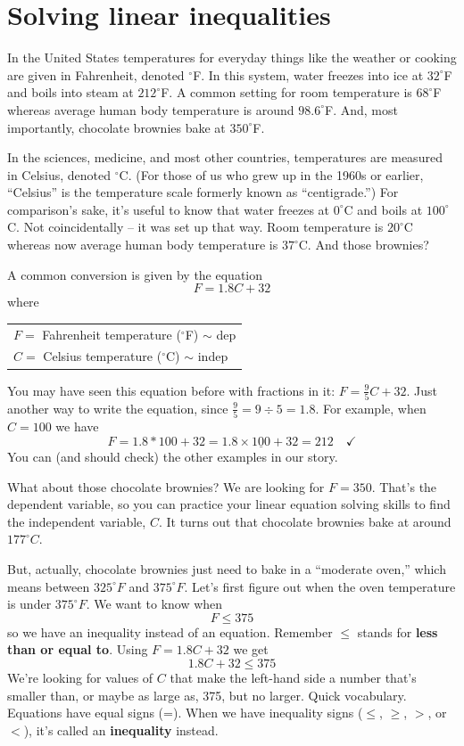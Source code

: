 

\section{Solving linear inequalities }

In the United States temperatures for everyday things like the weather or cooking are given in Fahrenheit, denoted $^\circ$F.  In this system, water freezes into ice at $32^\circ$F and boils into steam at $212^\circ$F.  A common setting for room temperature is $68^\circ$F whereas average human body temperature is around $98.6^\circ$F.  And, most importantly, chocolate brownies bake at $350^\circ$F.

In the sciences, medicine, and most other countries, temperatures are measured in Celsius, denoted $^\circ$C.  (For those of us who grew up in the 1960s or earlier, ``Celsius'' is the temperature scale formerly known as ``centigrade.'') 
For comparison's sake, it's useful to know that water freezes at $0^\circ$C and boils at $100^\circ$C.  Not coincidentally -- it was set up that way.  Room temperature is $20^\circ$C whereas now average human body temperature is $37^\circ$C.  And those brownies? 
 
A common conversion is given by the equation $$F = 1.8C+32$$ 
where 
\begin{center}
\begin{tabular} {l} 
$F=$ Fahrenheit temperature ($^\circ$F) $\sim$ dep \\
$C=$ Celsius temperature ($^\circ$C) $\sim$ indep \\ 
\end{tabular}
\end{center}
You may have seen this equation before with fractions in it:  $F = \frac{9}{5}C + 32$.  Just another way to write the equation, since $\frac{9}{5} = 9 \div 5 = 1.8$.  
For example, when $C=100$ we have $$F= 1.8 \ast 100 + 32 =1.8 \times \underline{100}+32= 212 \quad \checkmark$$   You can (and should check) the other examples in our story.
 
 What about those chocolate brownies?  
We are looking for $F=350$.  That's the dependent variable, so you can practice your  linear equation solving skills to find the independent variable, $C$.  It turns out that chocolate brownies bake at around $177^\circ C$.

But, actually, chocolate brownies just need to bake in a ``moderate oven,'' which means between $325^\circ F$ and $375^\circ F$.  Let's first figure out when the oven temperature is under $375^\circ F$.  We want to know when $$F \le 375$$
so we have an inequality instead of an equation. Remember $\le$ stands for \textbf{less than or equal to}. Using  $F=1.8C+32$ we get $$1.8C+32 \le 375$$  We're looking for values of $C$ that make the left-hand side a number that's smaller than, or maybe as large as, 375, but no larger.  Quick vocabulary.  Equations have equal signs (=).  When we have inequality signs ($\le$, $\ge$, $>$, or $<$), it's called an \textbf{inequality} instead.

